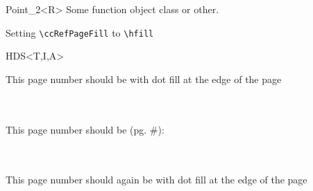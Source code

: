\begin{ccRefFunctionObjectClass}{Point_2<R>}
Some function object class or other.
\end{ccRefFunctionObjectClass}


Setting \verb|\ccRefPageFill| to \verb|\hfill|

\renewcommand{\ccRefPageFill}{\hfill}

\begin{ccRefConcept}{HDS<T,I,A>}

This page number should be with dot fill at the edge of the page
\renewcommand{\ccRefPageFill}{\dotfill}

 \\
 \\

This page number should be (pg. \#):

\gdef\ccRefPageNumAtMargin{\ccFalse}
 \\
 \\

This page number should again be with dot fill at the edge of the page

\gdef\ccRefPageNumAtMargin{\ccTrue}
 \\
 \\

\end{ccRefConcept}






